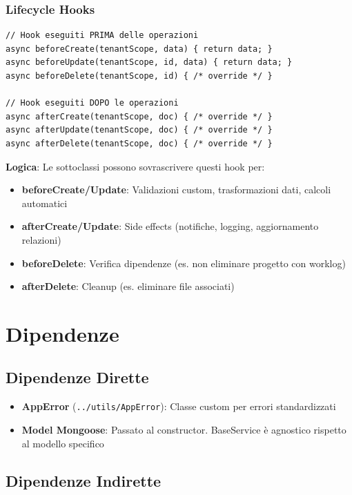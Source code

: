 \documentclass[11pt,a4paper]{article}
\begin{document}
\subsubsection{Lifecycle Hooks}

\begin{lstlisting}
// Hook eseguiti PRIMA delle operazioni
async beforeCreate(tenantScope, data) { return data; }
async beforeUpdate(tenantScope, id, data) { return data; }
async beforeDelete(tenantScope, id) { /* override */ }

// Hook eseguiti DOPO le operazioni
async afterCreate(tenantScope, doc) { /* override */ }
async afterUpdate(tenantScope, doc) { /* override */ }
async afterDelete(tenantScope, doc) { /* override */ }
\end{lstlisting}

\textbf{Logica}: Le sottoclassi possono sovrascrivere questi hook per:
\begin{itemize}
    \item \textbf{beforeCreate/Update}: Validazioni custom, trasformazioni dati, calcoli automatici
    \item \textbf{afterCreate/Update}: Side effects (notifiche, logging, aggiornamento relazioni)
    \item \textbf{beforeDelete}: Verifica dipendenze (es. non eliminare progetto con worklog)
    \item \textbf{afterDelete}: Cleanup (es. eliminare file associati)
\end{itemize}

\section{Dipendenze}

\subsection{Dipendenze Dirette}

\begin{itemize}
    \item \textbf{AppError} (\texttt{../utils/AppError}): Classe custom per errori standardizzati
    \item \textbf{Model Mongoose}: Passato al constructor. BaseService è agnostico rispetto al modello specifico
\end{itemize}

\subsection{Dipendenze Indirette}
\end{document}
